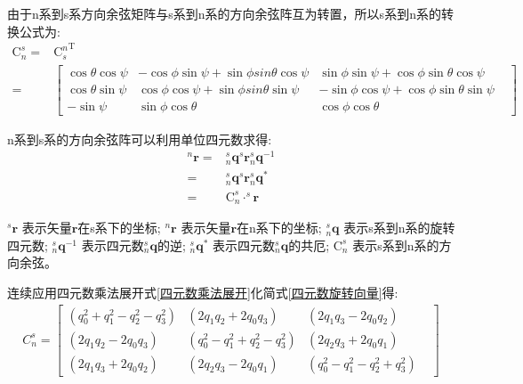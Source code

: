 由于n系到s系方向余弦矩阵与s系到n系的方向余弦阵互为转置\citep{方向余弦阵}，所以s系到n系的转换公式为:
\begin{equation}\label{欧拉角s转n}
    \begin{split} 
        \mathrm{C}^s_n=&{\mathrm{C}^n_s}^\mathrm{T} \\
             =&\left[\begin{matrix}
                \cos{\theta}\cos{\psi} & -\cos{\phi}\sin{\psi}+\sin{\phi}sin{\theta}\cos{\psi} &  \sin{\phi}\sin{\psi} + \cos{\phi}\sin{\theta}\cos{\psi} & \\
                \cos{\theta}\sin{\psi} &  \cos{\phi}\cos{\psi}+\sin{\phi}sin{\theta}\sin{\psi} & -\sin{\phi}\cos{\psi} + \cos{\phi}\sin{\theta}\sin{\psi} & \\
                -\sin{\psi} & \sin{\phi}\cos{\theta} & \cos{\phi}\cos{\theta} &
                \end{matrix}\right]
    \end{split}
\end{equation} 

n系到s系的方向余弦阵可以利用单位四元数\citep{四元数矢量旋转证明1,四元数矢量旋转证明2}求得:
\begin{equation}\label{四元数旋转向量}
    \begin{split} 
        ^n\bm{r} 
        = &^s_n\bm{q} ^s\bm{r} ^s_n\bm{q}^{-1} \\
        = &^s_n\bm{q} ^s\bm{r} ^s_n\bm{q}^{*} \\
        = &\mathrm{C}^s_n \cdot ^s\bm{r}
    \end{split}
\end{equation} 

$^s\bm{r}$          表示矢量$\bm{r}$在s系下的坐标;
$^n\bm{r}$          表示矢量$\bm{r}$在n系下的坐标;
$^s_n\bm{q}$        表示s系到n系的旋转四元数;
$^s_n\bm{q}^{-1}$   表示四元数$^s_n\bm{q}$的逆\citep{四元数矢量旋转证明1,四元数矢量旋转证明2};
$^s_n\bm{q}^{*}$    表示四元数$^s_n\bm{q}$的共厄\citep{四元数矢量旋转证明1,四元数矢量旋转证明2};
$\mathrm{C}^s_n$    表示s系到n系的方向余弦。

连续应用四元数乘法展开式\ref{四元数乘法展开}化简式\ref{四元数旋转向量}得:
\begin{equation}\label{四元数方向余弦阵}
    \begin{split} 
        C^s_n = \left[\begin{matrix} 
                (q^2_0+q^2_1-q^2_2-q^2_3) & (2q_1q_2+2q_0q_3) & (2q_1q_3-2q_0q_2) & \\
                (2q_1q_2-2q_0q_3) & (q^2_0-q^2_1+q^2_2-q^2_3) & (2q_2q_3+2q_0q_1) & \\
                (2q_1q_3+2q_0q_2) & (2q_2q_3-2q_0q_1) & (q^2_0-q^2_1-q^2_2+q^2_3) &
        \end{matrix}\right]
    \end{split}
\end{equation} 

